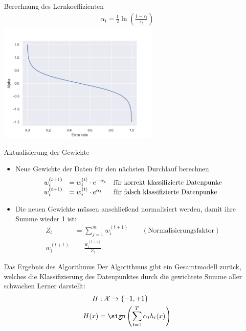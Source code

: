\documentclass[hyperref={bookmarks=false},11pt,dvipsnames]{beamer}
\begin{document}
\begin{frame}[t]{Berechnung des Lernkoeffizienten}
	\begin{align*}
		\alpha_t =\frac{1}{2}\ln\left(\frac{1-\varepsilon_t}{\varepsilon_t}\right)
	\end{align*}
	\centering\includegraphics[width=0.6\textwidth]{../Ausarbeitung/figures/alpha_graph.png}
\end{frame}

\begin{frame}[t]{Aktualisierung der Gewichte}
	\begin{itemize}
		\item <1-> Neue Gewichte der Daten für den nächsten Durchlauf berechnen
		      \begin{align*}
			      \begin{array}{l l l}
				      w^{(t+1)}_i & = w^{(t)}_i \cdot e^{-\alpha_t} & \text{für korrekt klassifizierte Datenpunke} \\
				      w^{(t+1)}_i & = w^{(t)}_i \cdot e^{\alpha_t}  & \text{für falsch klassifizierte Datenpunke}
			      \end{array}
		      \end{align*}
		\item <2-> Die neuen Gewichte müssen anschließend normalisiert werden, damit ihre Summe wieder 1 ist:
		      \begin{align*}
			      Z_t         & =\sum_{j=1}^m w^{(t+1)}_i\qquad(\text{Normalisierungsfaktor}) \\
			      w^{(t+1)}_i & = \frac{w^{(t+1)}_i}{Z_t}
		      \end{align*}
	\end{itemize}
\end{frame}

\begin{frame}[t]{Das Ergebnis des Algorithmus}
	Der Algorithmus gibt ein Gesamtmodell zurück, welches die Klassifizierung des Datenpunktes durch die gewichtete
	Summe aller schwachen Lerner darstellt:
	\begin{align*}
		H    & :      \mathcal{X} \rightarrow \{-1, +1\}       \\
		H(x) & =  \sign\left(\sum_{t=1}^T\alpha_th_t(x)\right)
	\end{align*}
\end{frame}
\end{document}
